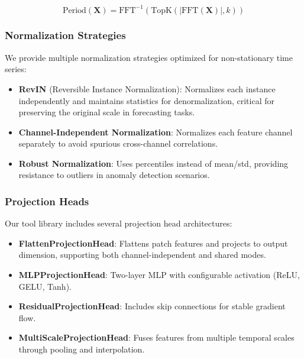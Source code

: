 \begin{equation}
    \text{Period}(\mathbf{X}) = \text{FFT}^{-1}\left(\text{TopK}\left(|\text{FFT}(\mathbf{X})|, k\right)\right)
\end{equation}

\subsubsection{Normalization Strategies}
\label{appx:normalization}

We provide multiple normalization strategies optimized for non-stationary time series:

\begin{itemize}[leftmargin=*, itemsep=1pt]
    \item \textbf{RevIN} (Reversible Instance Normalization): Normalizes each instance independently and maintains statistics for denormalization, critical for preserving the original scale in forecasting tasks.
    \item \textbf{Channel-Independent Normalization}: Normalizes each feature channel separately to avoid spurious cross-channel correlations.
    \item \textbf{Robust Normalization}: Uses percentiles instead of mean/std, providing resistance to outliers in anomaly detection scenarios.
\end{itemize}

\subsubsection{Projection Heads}
\label{appx:projection_heads}

Our tool library includes several projection head architectures:

\begin{itemize}[leftmargin=*, itemsep=1pt]
    \item \textbf{FlattenProjectionHead}: Flattens patch features and projects to output dimension, supporting both channel-independent and shared modes.
    \item \textbf{MLPProjectionHead}: Two-layer MLP with configurable activation (ReLU, GELU, Tanh).
    \item \textbf{ResidualProjectionHead}: Includes skip connections for stable gradient flow.
    \item \textbf{MultiScaleProjectionHead}: Fuses features from multiple temporal scales through pooling and interpolation.
\end{itemize}

